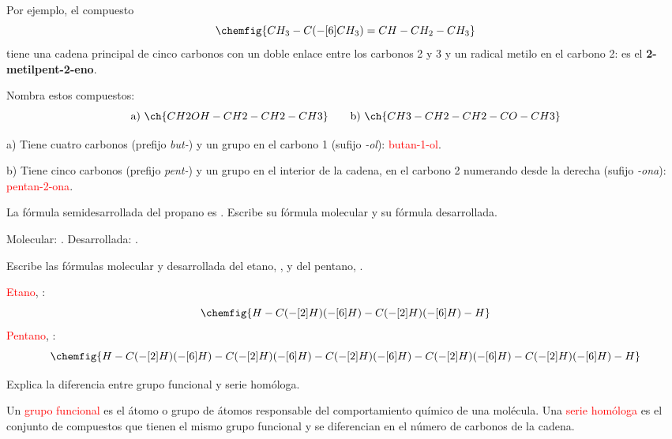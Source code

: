 Por ejemplo, el compuesto
\[ \chemfig{CH_3-C(-[6]CH_3)=CH-CH_2-CH_3} \]
tiene una cadena principal de cinco carbonos con un doble enlace entre los carbonos 2 y 3 y un radical metilo en el carbono 2: es el \textbf{2-metilpent-2-eno}.

\begin{example}
    Nombra estos compuestos:
    \[ \text{a)}\ \ch{CH2OH-CH2-CH2-CH3} \qquad \text{b)}\ \ch{CH3-CH2-CH2-CO-CH3} \]

    a) Tiene cuatro carbonos (prefijo \emph{but-}) y un grupo  en el carbono 1 (sufijo \emph{-ol}): \textcolor{red}{butan-1-ol}.

    b) Tiene cinco carbonos (prefijo \emph{pent-}) y un grupo  en el interior de la cadena, en el carbono 2 numerando desde la derecha (sufijo \emph{-ona}): \textcolor{red}{pentan-2-ona}.
\end{example}

\begin{exercise}
    La fórmula semidesarrollada del propano es . Escribe su fórmula molecular y su fórmula desarrollada.
    \begin{solu}
        Molecular: \textcolor{red}{}. Desarrollada: .
    \end{solu}
\end{exercise}

\begin{exercise}
    Escribe las fórmulas molecular y desarrollada del etano, , y del pentano, .
    \begin{solu}
        \textcolor{red}{Etano}, :
        \[ \chemfig{H-C(-[2]H)(-[6]H)-C(-[2]H)(-[6]H)-H} \]
        \textcolor{red}{Pentano}, :
        \[ \chemfig{H-C(-[2]H)(-[6]H)-C(-[2]H)(-[6]H)-C(-[2]H)(-[6]H)-C(-[2]H)(-[6]H)-C(-[2]H)(-[6]H)-H} \]
    \end{solu}
\end{exercise}

\begin{exercise}
    Explica la diferencia entre grupo funcional y serie homóloga.
    \begin{solu}
        Un \textcolor{red}{grupo funcional} es el átomo o grupo de átomos responsable del comportamiento químico de una molécula. Una \textcolor{red}{serie homóloga} es el conjunto de compuestos que tienen el mismo grupo funcional y se diferencian en el número de carbonos de la cadena.
    \end{solu}
\end{exercise}

